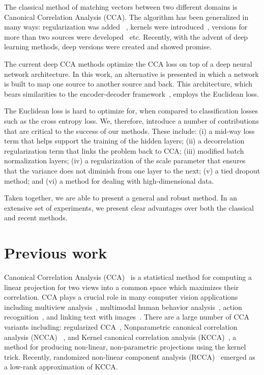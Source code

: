 \documentclass[10pt,twocolumn,letterpaper]{article}
\begin{document}
The classical method of matching vectors between two different domains is  Canonical Correlation Analysis (CCA). The algorithm has been generalized in many ways: regularization was added ~\cite{martin1979multivariate}, kernels were introduced~\cite{kcca1,kcca2,kcca3}, versions for more than two sources were developed~\cite{Tenenhaus2011} etc. Recently, with the advent of deep learning methods, deep versions were created and showed promise. 

The current deep CCA methods optimize the CCA loss on top of a deep neural network architecture. In this work, an alternative is presented in which a network is built to map one source  to another source  and back. This architecture, which bears similarities to the encoder-decoder framework~\cite{hintonnature}, employs the Euclidean loss. 

The Euclidean loss is hard to optimize for, when compared to classification losses such as the cross entropy loss. We, therefore, introduce a number of contributions that are critical to the success of our methods. These include: (i) a mid-way loss term that helps support the training of the hidden layers; (ii) a decorrelation regularization term that links the problem back to CCA; (iii) modified batch normalization layers; (iv) a regularization of the scale parameter that ensures that the variance does not diminish from one layer to the next; (v) a tied dropout method; and (vi) a method for dealing with high-dimensional data.

Taken together, we are able to present a general and robust method. In an extensive set of experiments, we present clear advantages over both the classical and recent methods.

\section{Previous work}
Canonical Correlation Analysis (CCA)~\cite{cca} is a statistical method for computing a linear projection for two views into a common space which maximizes their correlation. CCA plays a crucial role in many computer vision applications including multiview analysis~\cite{conf/cvpr/SharmaKDJ12}, multimodal human behavior analysis~\cite{song_multimodal_2012}, action recognition~\cite{4547427}, and linking text with images~\cite{Klein_2015_CVPR}. There are a large number of CCA variants including: regularized CCA~\cite{regularized_cca}, Nonparametric canonical correlation analysis (NCCA) ~\cite{DBLP:journals/corr/MichaeliWL15}, and Kernel canonical correlation analysis (KCCA)~\cite{kcca1,kcca2,kcca3}, a method for producing non-linear, non-parametric projections using the kernel trick. Recently, randomized non-linear component analysis (RCCA)~\cite{rcca} emerged as a low-rank approximation of KCCA. 
\end{document}
